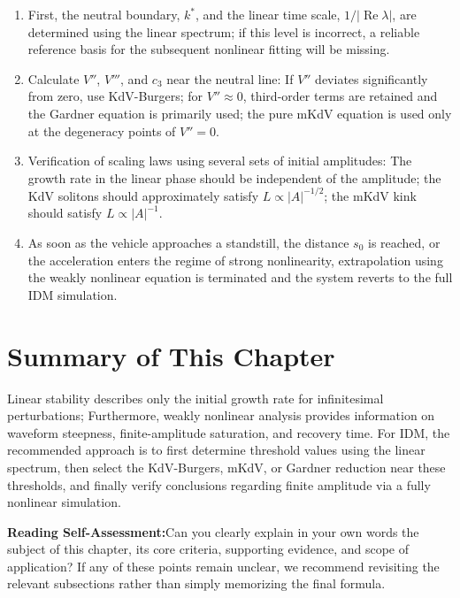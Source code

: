 \documentclass[11pt,a4paper,openany]{book}
\numberwithin{equation}{chapter}
\numberwithin{figure}{chapter}
\numberwithin{table}{chapter}
\newcommand{\sectionwrapup}[1]{%
  \section{Summary of This Chapter}
  \begin{tcolorbox}[summarybox,title=\textbf{Chapter Review}]
  #1
  \par\smallskip
  \textbf{Reading Self-Assessment:}Can you clearly explain in your own words the subject of this chapter, its core criteria, supporting evidence, and scope of application? If any of these points remain unclear, we recommend revisiting the relevant subsections rather than simply memorizing the final formula.
\end{tcolorbox}
  \clearpage
}
\begin{document}
\begin{enumerate}[leftmargin=1.6em,itemsep=4pt]
\item






First, the neutral boundary, $k^*$, and the linear time scale, $1/|\operatorname{Re}\lambda|$, are determined using the linear spectrum; if this level is incorrect, a reliable reference basis for the subsequent nonlinear fitting will be missing.









\item






Calculate $V''$, $V'''$, and $c_3$ near the neutral line: If $V''$ deviates significantly from zero, use KdV-Burgers; for $V''\approx0$, third-order terms are retained and the Gardner equation is primarily used; the pure mKdV equation is used only at the degeneracy points of $V''=0$.




\item

Verification of scaling laws using several sets of initial amplitudes: The growth rate in the linear phase should be independent of the amplitude; the KdV solitons should approximately satisfy $L\propto|A|^{-1/2}$; the mKdV kink should satisfy $L\propto|A|^{-1}$.









\item






As soon as the vehicle approaches a standstill, the distance $s_0$ is reached, or the acceleration enters the regime of strong nonlinearity, extrapolation using the weakly nonlinear equation is terminated and the system reverts to the full IDM simulation.









\end{enumerate}

\sectionwrapup{Linear stability describes only the initial growth rate for infinitesimal perturbations; Furthermore, weakly nonlinear analysis provides information on waveform steepness, finite-amplitude saturation, and recovery time. For IDM, the recommended approach is to first determine threshold values ​​using the linear spectrum, then select the KdV-Burgers, mKdV, or Gardner reduction near these thresholds, and finally verify conclusions regarding finite amplitude via a fully nonlinear simulation.}
\end{document}
